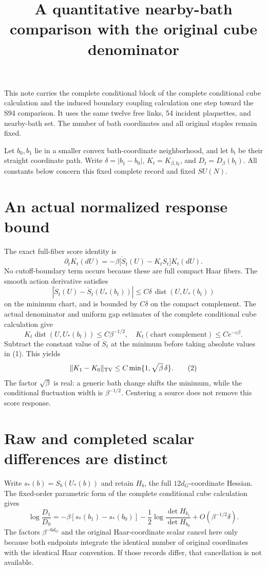 \documentclass{article}
\title{A quantitative nearby-bath comparison with the original cube denominator}\author{}\date{}
\begin{document}
\maketitle
This note carries the complete conditional block of the complete conditional cube calculation and the induced boundary coupling calculation one step toward the S94 comparison. It uses the same twelve free links, 54 incident plaquettes, and nearby-bath set. The number of bath coordinates and all original staples remain fixed.

Let $b_0,b_1$ lie in a smaller convex bath-coordinate neighborhood, and let $b_t$ be their straight coordinate path. Write $\delta=|b_1-b_0|$, $K_t=K_{\beta,b_t}$, and $D_t=D_\beta(b_t)$. All constants below concern this fixed complete record and fixed $SU(N)$.

\section{An actual normalized response bound}
The exact full-fiber score identity is
\[
 \partial_tK_t(dU)=-\beta\big[\dot S_t(U)-K_t\dot S_t\big]K_t(dU).
 \tag{1}
\]
No cutoff-boundary term occurs because these are full compact Haar fibers. The smooth action derivative satisfies
\[
 |\dot S_t(U)-\dot S_t(U_*(b_t))|
 \leq C\delta\,\operatorname{dist}(U,U_*(b_t))
\]
on the minimum chart, and is bounded by $C\delta$ on the compact complement. The actual denominator and uniform gap estimates of the complete conditional cube calculation give
\[
 K_t\operatorname{dist}(U,U_*(b_t))\leq C\beta^{-1/2},
 \quad K_t(\text{chart complement})\leq Ce^{-c\beta}.
\]
Subtract the constant value of $\dot S_t$ at the minimum before taking absolute values in (1). This yields
\[
 \|K_1-K_0\|_{\rm TV}\leq
 C\min\{1,\sqrt\beta\,\delta\}.
 \tag{2}
\]
The factor $\sqrt\beta$ is real: a generic bath change shifts the minimum, while the conditional fluctuation width is $\beta^{-1/2}$. Centering a source does not remove this score response.

\section{Raw and completed scalar differences are distinct}
Write $s_*(b)=S_b(U_*(b))$ and retain $H_b$, the full $12d_G$-coordinate Hessian. The fixed-order parametric form of the complete conditional cube calculation gives
\[
 \log\frac{D_1}{D_0}
 =-\beta[s_*(b_1)-s_*(b_0)]
 -\frac12\log\frac{\det H_{b_1}}{\det H_{b_0}}
 +O(\beta^{-1/2}\delta).
 \tag{3}
\]
The factors $\beta^{-6d_G}$ and the original Haar-coordinate scalar cancel here only because both endpoints integrate the identical number of original coordinates with the identical Haar convention. If those records differ, that cancellation is not available.
\end{document}
